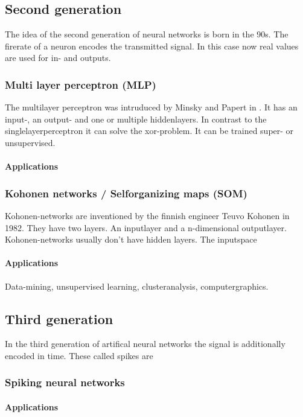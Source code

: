 \documentclass[10pt,a4paper,DIV=11]{scrreprt}
\begin{document}
\subsection{Second generation}
The idea of the second generation of neural networks is born in the 90s. The firerate of a neuron encodes the transmitted signal. In this case now real values are used for in- and outputs.

\subsubsection{Multi layer perceptron (MLP)} \label{sec:mlp}
The multilayer perceptron was intruduced by Minsky and Papert in . It has an input-, an output- and
one or multiple hiddenlayers. In contrast to the singlelayerperceptron it can
solve the xor-problem. It can be trained super- or unsupervised.

\paragraph{Applications}

\subsubsection{Kohonen networks / Selforganizing maps (SOM)}
Kohonen-networks are inventioned by the finnish engineer Teuvo Kohonen in 1982. They have two layers. An inputlayer and a n-dimensional outputlayer.
Kohonen-networks usually don't have hidden layers.
The inputspace 

\paragraph{Applications}
Data-mining, unsupervised learning, clusteranalysis, computergraphics. 

\subsection{Third generation}
In the third generation of artifical neural networks the signal is additionally encoded in time. These called spikes are

\subsubsection{Spiking neural networks}

\paragraph{Applications}
\end{document}
